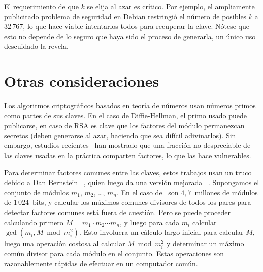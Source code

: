   El requerimiento de que \(k\) se elija al azar es crítico.
  Por ejemplo,
  el ampliamente publicitado problema de seguridad en Debian
  restringió el número de posibles \(k\) a \(32\,767\),
  lo que hace viable intentarlos todos para recuperar la clave.
  Nótese que esto no depende
  de lo seguro que haya sido el proceso de generarla,
  un único uso descuidado la revela.



\section{Otras consideraciones}
\label{sec:consideraciones-modulos}

  Los algoritmos criptográficos basados en teoría de números
  usan números primos como partes de sus claves.
  En el caso de Diffie-Hellman,
  el primo usado puede publicarse,
  en caso de RSA
  es clave que los factores del módulo permanezcan secretos
  (deben generarse al azar,
   haciendo que sea difícil adivinarlos).
  Sin embargo,
  estudios recientes~%
    \cite{cryptoeprint:2012:064,
	  heninger12:_mining_your_ps_qs}
  han mostrado que una fracción no despreciable
  de las claves usadas en la práctica comparten factores,
  lo que las hace vulnerables.

  Para determinar factores comunes entre las claves,
  estos trabajos usan un truco debido a Dan Bernstein~%
    \cite{bernstein05:_factor_compr_essen_linear_time},
  quien luego da una versión mejorada~%
    \cite{bernstein04:_faster_factorization_coprimes}.
  Supongamos el conjunto de módulos
  \(m_1\), \(m_2\), \ldots, \(m_n\).
  En el caso de~\cite{cryptoeprint:2012:064}
  son \(4,7\)~millones de módulos de \(1\,024\)~bits,
  y calcular los máximos comunes divisores de todos los pares
  para detectar factores comunes está fuera de cuestión.
  Pero se puede proceder
  calculando primero \(M = m_1 \cdot m_2 \dotsm m_n\),
  y luego para cada \(m_i\) calcular
  \(\gcd(m_i, M \bmod m_i^2)\).
  Esto involucra un cálculo largo inicial para calcular \(M\),
  luego una operación costosa al calcular \(M \bmod m_i^2\)
  y determinar un máximo común divisor
  para cada módulo en el conjunto.
  Estas operaciones son razonablemente rápidas de efectuar
  en un computador común.

